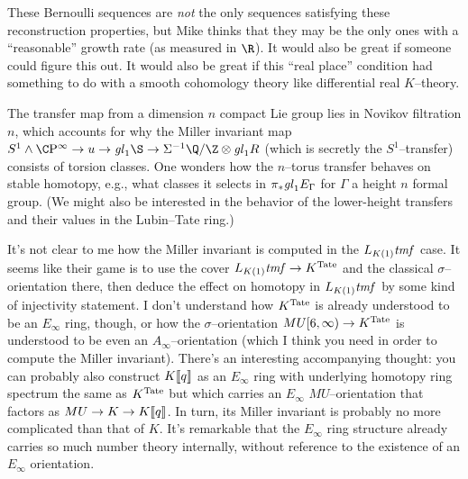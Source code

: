 These Bernoulli sequences are \emph{not} the only sequences satisfying these reconstruction properties, but Mike thinks that they may be the only ones with a ``reasonable'' growth rate (as measured in $\R$).  It would also be great if someone could figure this out.  It would also be great if this ``real place'' condition had something to do with a smooth cohomology theory like differential real $K$--theory.

The transfer map from a dimension $n$ compact Lie group lies in Novikov filtration $n$, which accounts for why the Miller invariant map $S^1 \sm \CP^\infty \to u \to \gl_1 \S \to \Susp^{-1} \Q/\Z \otimes \gl_1 R$ (which is secretly the $S^1$--transfer) consists of torsion classes.  One wonders how the $n$--torus transfer behaves on stable homotopy, e.g., what classes it selects in $\pi_* \mathit{gl}_1 E_\Gamma$ for $\Gamma$ a height $n$ formal group.  (We might also be interested in the behavior of the lower-height transfers and their values in the Lubin--Tate ring.)

It's not clear to me how the Miller invariant is computed in the $L_{K(1)} \mathit{tmf}$ case.  It seems like their game is to use the cover $L_{K(1)} \mathit{tmf} \to K^{\mathrm{Tate}}$ and the classical $\sigma$--orientation there, then deduce the effect on homotopy in $L_{K(1)} \mathit{tmf}$ by some kind of injectivity statement.  I don't understand how $K^{\mathrm{Tate}}$ is already understood to be an $E_\infty$ ring, though, or how the $\sigma$--orientation $MU[6, \infty) \to K^{\mathrm{Tate}}$ is understood to be even an $A_\infty$--orientation (which I think you need in order to compute the Miller invariant).  There's an interesting accompanying thought: you can probably also construct $K\llbracket{q}\rrbracket$ as an $E_\infty$ ring with underlying homotopy ring spectrum the same as $K^{\mathrm{Tate}}$ but which carries an $E_\infty$ $MU$--orientation that factors as $MU \to K \to K\llbracket{q}\rrbracket$.  In turn, its Miller invariant is probably no more complicated than that of $K$.  It's remarkable that the $E_\infty$ ring structure already carries so much number theory internally, without reference to the existence of an $E_\infty$ orientation.















